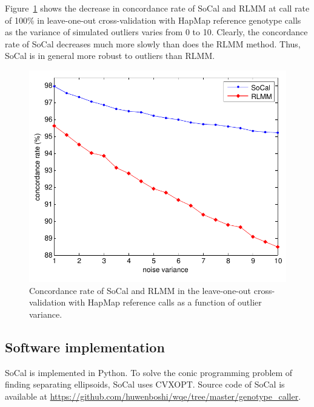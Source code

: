 \documentclass{scrartcl}
\begin{document}
\par
Figure~\ref{fig:result_cmp_noise} shows the decrease in concordance rate of
SoCal and RLMM at call rate of 100\% in leave-one-out cross-validation with
HapMap reference genotype calls as the variance of simulated outliers varies
from 0 to 10.
Clearly, the concordance rate of SoCal decreases much more slowly than does
the RLMM method.
Thus, SoCal is in general more robust to outliers than RLMM.

\begin{figure}[H]
\centering
\includegraphics[scale=0.75]
{result_figs/cmp_socal_gauss_noise/socal_gauss_cmp_noise.pdf}
\caption{Concordance rate of SoCal and RLMM in the leave-one-out
cross-validation with HapMap reference calls as a function of outlier
variance.}
\label{fig:result_cmp_noise}
\end{figure}

\subsection{Software implementation}
SoCal is implemented in Python.
To solve the conic programming problem of finding separating ellipsoids,
SoCal uses CVXOPT.
Source code of SoCal is available at
\url{https://github.com/huwenboshi/wqe/tree/master/genotype_caller}.
\end{document}
